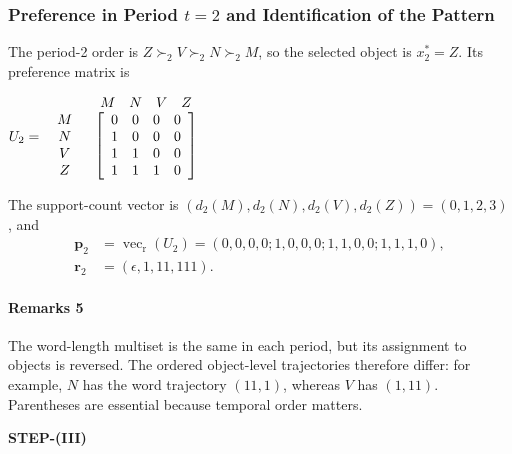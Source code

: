 \documentclass[conference]{IEEEtran}
\theoremstyle{plain}
\theoremstyle{definition}
\theoremstyle{remark}
\begin{document}
	\subsubsection{Preference in Period \texorpdfstring{$ t=2 $}{t=2} and Identification of the Pattern}
	The period-2 order is $Z\succ_2 V\succ_2 N\succ_2 M$, so the selected object is $x_2^*=Z$. Its preference matrix is
	\begin{center}
		$U_2=
		\begin{array}{c c c c } &
			\begin{array}{c c c c} M & N & V & Z \\
			\end{array}
			\\
			\begin{array}{c c c c}
				M \\
				N\\
				V\\
				Z\\
			\end{array}
			&
			\left[
			\begin{array}{c c c c}
				0 & 0 & 0 & 0 \\
				1 & 0 & 0 & 0 \\
				1 & 1 & 0 & 0 \\
				1 & 1 & 1 & 0
			\end{array}
			\right]
		\end{array}
		$
	\end{center}
	The support-count vector is $(d_2(M),d_2(N),d_2(V),d_2(Z))=(0,1,2,3)$, and
	\begin{align}
		\mathbf p_2&=\operatorname{vec}_{\mathrm r}(U_2)
		=(0,0,0,0;1,0,0,0;1,1,0,0;1,1,1,0),\\
		\mathbf r_2&=(\epsilon,1,11,111).
	\end{align}
	\paragraph{Remarks 5} The word-length multiset is the same in each period, but its assignment to objects is reversed. The ordered object-level trajectories therefore differ: for example, $N$ has the word trajectory $(11,1)$, whereas $V$ has $(1,11)$. Parentheses are essential because temporal order matters.
	\begin{center}
		\textbf{STEP-(III)}
	\end{center}
\end{document}
